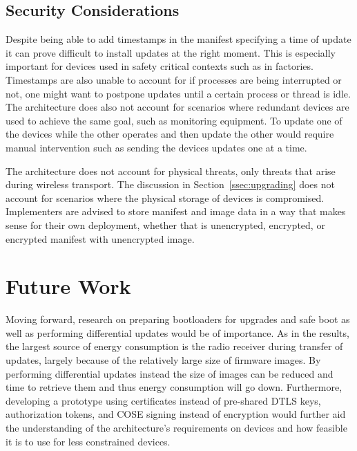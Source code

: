 \documentclass[0-thesis.tex]{subfiles}
\begin{document}
\subsection{Security Considerations}
\label{ssec:security-considerations}
Despite being able to add timestamps in the manifest specifying a time of update it can
prove difficult to install updates at the right moment. This is especially important for
devices used in safety critical contexts such as in factories. Timestamps are also unable
to account for if processes are being interrupted or not, one might want to postpone
updates until a certain process or thread is idle. The architecture does also not account
for scenarios where redundant devices are used to achieve the same goal, such as
monitoring equipment. To update one of the devices while the other operates and then
update the other would require manual intervention such as sending the devices updates one
at a time.

The architecture does not account for physical threats, only threats that arise during
wireless transport. The discussion in Section~\ref{ssec:upgrading} does not account for
scenarios where the physical storage of devices is compromised. Implementers are advised
to store manifest and image data in a way that makes sense for their own deployment,
whether that is unencrypted, encrypted, or encrypted manifest with unencrypted image.


\section{Future Work}
\label{sec:future-work}
Moving forward, research on preparing bootloaders for upgrades and safe boot as well as
performing differential updates would be of importance. As in the results, the largest
source of energy consumption is the radio receiver during transfer of updates, largely
because of the relatively large size of firmware images. By performing differential
updates instead the size of images can be reduced and time to retrieve them and thus
energy consumption will go down. Furthermore, developing a prototype using certificates
instead of pre-shared DTLS keys, authorization tokens, and COSE signing instead of
encryption would further aid the understanding of the architecture's requirements on
devices and how feasible it is to use for less constrained devices. 
\end{document}
